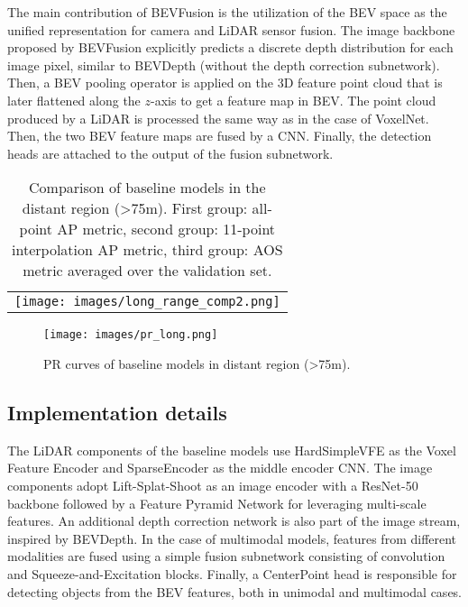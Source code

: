 \documentclass{article}
\begin{document}
The main contribution of BEVFusion is the utilization of the BEV space as the unified representation for camera and LiDAR sensor fusion. The image backbone proposed by BEVFusion explicitly predicts a discrete depth distribution for each image pixel, similar to BEVDepth (without the depth correction subnetwork). Then, a BEV pooling operator is applied on the 3D feature point cloud that is later flattened along the $z$-axis to get a feature map in BEV. The point cloud produced by a LiDAR is processed the same way as in the case of VoxelNet. Then, the two BEV feature maps are fused by a CNN. Finally, the detection heads are attached to the output of the fusion subnetwork.

\begin{table}[t]
  \centering  
  \begin{tabular}{c}       
    \texttt{[image: images/long\_range\_comp2.png]}
  \end{tabular}
  \caption{Comparison of baseline models in the distant region (\textgreater75m). First group: all-point AP metric, second group: 11-point interpolation AP metric, third group: AOS metric averaged over the validation set.}
  \label{tab:metrics-distant}
\end{table}

\begin{figure}[t]
  \centering
   \texttt{[image: images/pr\_long.png]}
   \caption{PR curves of baseline models in distant region (\textgreater75m).}
   \label{fig:pr-curves-distant}
\end{figure}

\subsection{Implementation details}
The LiDAR components of the baseline models use HardSimpleVFE \citep{yan2018second} as the Voxel Feature Encoder and SparseEncoder \citep{yan2018second} as the middle encoder CNN. The image components adopt Lift-Splat-Shoot \citep{philion2020lift} as an image encoder with a ResNet-50 backbone followed by a Feature Pyramid Network \citep{lin2017feature} for leveraging multi-scale features. An additional depth correction network is also part of the image stream, inspired by BEVDepth. In the case of multimodal models, features from different modalities are fused using a simple fusion subnetwork consisting of convolution and Squeeze-and-Excitation \citep{hu2018squeeze} blocks. Finally, a CenterPoint \citep{yin2021center} head is responsible for detecting objects from the BEV features, both in unimodal and multimodal cases.
\end{document}
